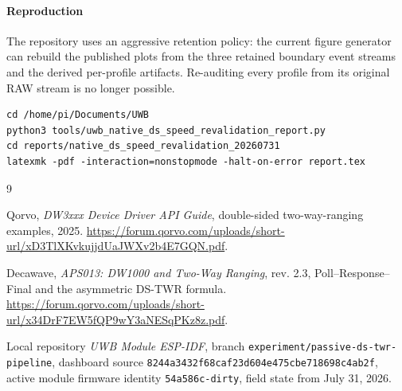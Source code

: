 \documentclass[11pt,a4paper]{article}
\begin{document}
\paragraph{Reproduction}
The repository uses an aggressive retention policy: the current figure
generator can rebuild the published plots from the three retained boundary
event streams and the derived per-profile artifacts. Re-auditing every
profile from its original RAW stream is no longer possible.
\begin{verbatim}
cd /home/pi/Documents/UWB
python3 tools/uwb_native_ds_speed_revalidation_report.py
cd reports/native_ds_speed_revalidation_20260731
latexmk -pdf -interaction=nonstopmode -halt-on-error report.tex
\end{verbatim}

\begin{thebibliography}{9}

Qorvo, \emph{DW3xxx Device Driver API Guide}, double-sided two-way-ranging
examples, 2025.
\url{https://forum.qorvo.com/uploads/short-url/xD3TlXKvkujjdUaJWXv2b4E7GQN.pdf}.

Decawave, \emph{APS013: DW1000 and Two-Way Ranging}, rev. 2.3,
Poll--Response--Final and the asymmetric DS-TWR formula.
\url{https://forum.qorvo.com/uploads/short-url/x34DrF7EW5fQP9wY3aNESqPKz8z.pdf}.

Local repository \emph{UWB Module ESP-IDF}, branch
\texttt{experiment/passive-ds-twr-pipeline}, dashboard source
\texttt{8244a3432f68caf23d604e475cbe718698c4ab2f}, active module firmware
identity \texttt{54a586c-dirty}, field state from July 31, 2026.

\end{thebibliography}
\end{document}
